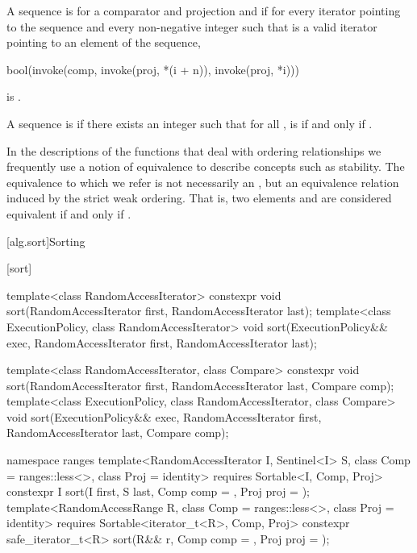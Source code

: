 \pnum
A sequence is
for a comparator and projection  and 
if for every iterator
pointing to the sequence and every non-negative integer
such that
is a valid iterator pointing to an element of the sequence,
\begin{codeblock}
bool(invoke(comp, invoke(proj, *(i + n)), invoke(proj, *i)))
\end{codeblock}
is .

\pnum
A sequence
is
if there exists an integer
such that for all
,
is  if and only if
.

\pnum
In the descriptions of the functions that deal with ordering relationships we frequently use a notion of
equivalence to describe concepts such as stability.
The equivalence to which we refer is not necessarily an
,
but an equivalence relation induced by the strict weak ordering.
That is, two elements
and
are considered equivalent if and only if
.

[alg.sort]{Sorting}

[sort]{}

%
\begin{itemdecl}
template<class RandomAccessIterator>
  constexpr void sort(RandomAccessIterator first, RandomAccessIterator last);
template<class ExecutionPolicy, class RandomAccessIterator>
  void sort(ExecutionPolicy&& exec,
            RandomAccessIterator first, RandomAccessIterator last);

template<class RandomAccessIterator, class Compare>
  constexpr void sort(RandomAccessIterator first, RandomAccessIterator last,
                      Compare comp);
template<class ExecutionPolicy, class RandomAccessIterator, class Compare>
  void sort(ExecutionPolicy&& exec,
            RandomAccessIterator first, RandomAccessIterator last,
            Compare comp);

namespace ranges {
  template<RandomAccessIterator I, Sentinel<I> S, class Comp = ranges::less<>,
      class Proj = identity>
    requires Sortable<I, Comp, Proj>
    constexpr I
      sort(I first, S last, Comp comp = {}, Proj proj = {});
  template<RandomAccessRange R, class Comp = ranges::less<>, class Proj = identity>
    requires Sortable<iterator_t<R>, Comp, Proj>
    constexpr safe_iterator_t<R>
      sort(R&& r, Comp comp = {}, Proj proj = {});
}
\end{itemdecl}


